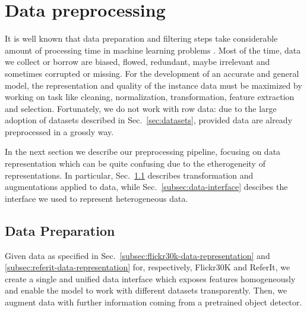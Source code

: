 \section{Data preprocessing}

It is well known that data preparation and filtering steps take
considerable amount of processing time in machine learning problems
\cite{kotsiantis2006data}. Most of the time, data we collect or borrow
are biased, flowed, redundant, maybe irrelevant and sometimes
corrupted or missing. For the development of an accurate and general
model, the representation and quality of the instance data must be
maximized by working on task like cleaning, normalization,
transformation, feature extraction and selection. Fortunately, we do
not work with row data: due to the large adoption of datasets
described in Sec.~\ref{sec:datasets}, provided data are already
preprocessed in a grossly way.

In the next section we describe our preprocessing pipeline, focusing
on data representation which can be quite confusing due to the
etherogeneity of representations. In particular,
Sec.~\ref{subsec:data-preparation} describes transformation and
augmentations applied to data, while Sec.~\ref{subsec:data-interface}
descibes the interface we used to represent heterogeneous data.

\subsection{Data Preparation}
\label{subsec:data-preparation}

Given data as specified in
Sec.~\ref{subsec:flickr30k-data-representation} and
\ref{subsec:referit-data-representation} for, respectively, Flickr30K
and ReferIt, we create a single and unified data interface which
exposes features homogeneously and enable the model to work with
different datasets transparently. Then, we augment data with further
information coming from a pretrained object detector.


